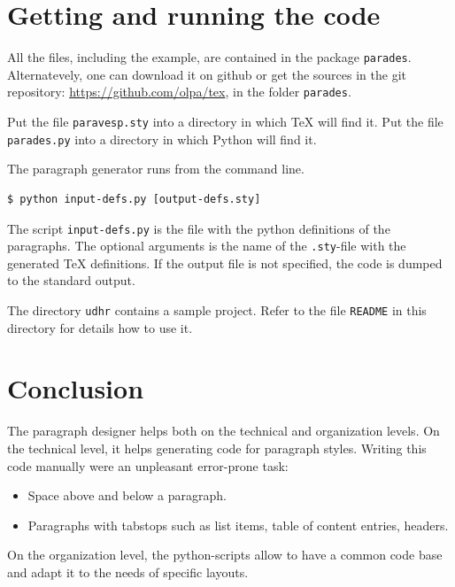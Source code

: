 \documentclass[]{ltugboat}
\begin{document}

\section{Getting and running the code}

All the files, including the example, are contained in the  package \verb|parades|. Alternatevely, one can download it on github or get the sources in the git repository: \url{https://github.com/olpa/tex}, in the folder \verb|parades|.

Put the file \verb|paravesp.sty| into a directory in which \TeX{} will find it. Put the file \verb|parades.py| into a directory in which Python will find it.

The paragraph generator runs from the command line.

\begin{verbatim}
$ python input-defs.py [output-defs.sty]
\end{verbatim}

The script \verb|input-defs.py| is the file with the python definitions of the paragraphs. The optional arguments is the name of the \verb|.sty|-file with the generated \TeX{} definitions. If the output file is not specified, the code is dumped to the standard output.

The directory \verb|udhr| contains a sample project. Refer to the file \verb|README| in this directory for details how to use it.

\section{Conclusion}

The paragraph designer helps both on the technical and organization levels.
On the technical level, it helps generating code for paragraph styles. Writing this code manually were an unpleasant error-prone task:

\begin{itemize}
\item Space above and below a paragraph.
\item Paragraphs with tabstops such as list items, table of content entries, headers.
\end{itemize}

On the organization level, the python-scripts allow to have a common code base and adapt it to the needs of specific layouts.
\end{document}
